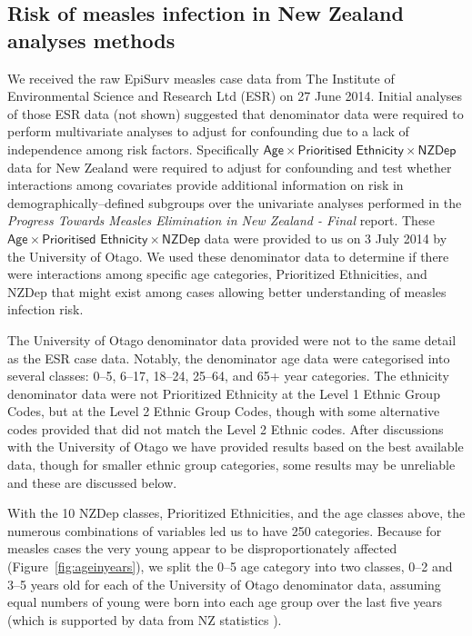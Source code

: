 \documentclass{article}
\begin{document}
\subsection{Risk of measles infection in New Zealand analyses methods}
\label{sub:regression}
We received the raw EpiSurv measles case data from The Institute of Environmental Science and Research Ltd (ESR) on 27 June 2014. Initial analyses of those ESR data (not shown) suggested that denominator data were required to perform multivariate analyses to adjust for confounding due to a lack of independence among risk factors. Specifically $\textsf{Age} \times \textsf{Prioritised Ethnicity} \times \textsf{NZDep}$ data for New Zealand were required to adjust for confounding and test whether interactions among covariates provide additional information on risk in demographically--defined subgroups over the univariate analyses performed in the \emph{Progress Towards Measles Elimination in New Zealand - Final} report. These $\textsf{Age} \times \textsf{Prioritised Ethnicity} \times \textsf{NZDep}$ data were provided to us on 3 July 2014 by the University of Otago. We used these denominator data to determine if there were interactions among specific age categories, Prioritized Ethnicities, and NZDep that might exist among cases allowing better understanding of measles infection risk.

The University of Otago denominator data provided were not to the same detail as the ESR case data. Notably, the denominator age data were categorised into several classes: 0--5, 6--17, 18--24, 25--64, and 65+ year categories. The ethnicity denominator data were not Prioritized Ethnicity at the Level 1 Ethnic Group Codes, but at the Level 2 Ethnic Group Codes, though with some alternative codes provided that did not match the Level 2 Ethnic codes. After discussions with the University of Otago we have provided results based on the best available data, though for smaller ethnic group categories, some results may be unreliable and these are discussed below.

With the 10 NZDep classes, Prioritized Ethnicities, and the age classes above, the numerous combinations of variables led us to have 250 categories. Because for measles cases the very young appear to be disproportionately affected (Figure~\autoref{fig:ageinyears}), we split the 0--5 age category into two classes, 0--2 and 3--5 years old for each of the University of Otago denominator data, assuming equal numbers of young were born into each age group over the last five years (which is supported by data from NZ statistics \citep{stats14}).
\end{document}
